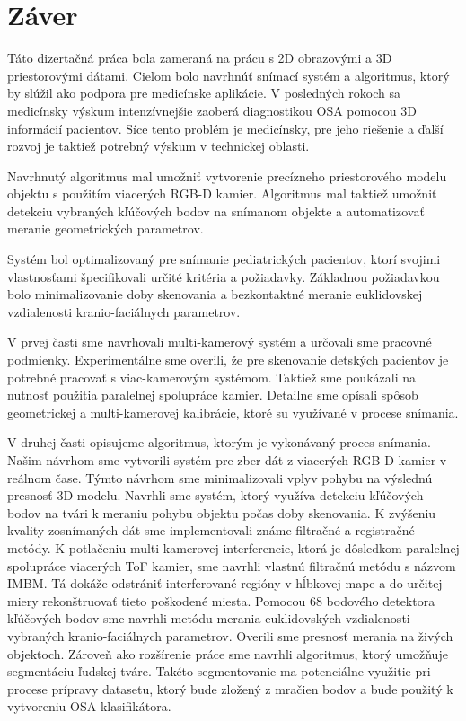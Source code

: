 \chapter{Záver}

\pagestyle{fancy}
\fancyhf{}
\fancyfoot[CE,CO]{\thepage}


Táto dizertačná práca bola zameraná na prácu s 2D obrazovými a 3D priestorovými dátami. Cieľom bolo navrhnúť snímací systém a algoritmus, ktorý by slúžil ako podpora pre medicínske aplikácie. V posledných rokoch sa medicínsky výskum intenzívnejšie zaoberá diagnostikou OSA pomocou 3D informácií pacientov. Síce tento problém je medicínsky, pre jeho riešenie a ďalší rozvoj je taktiež potrebný výskum v technickej oblasti. \newline

Navrhnutý algoritmus mal umožniť vytvorenie precízneho priestorového modelu objektu s použitím viacerých RGB-D kamier. Algoritmus mal taktiež umožniť detekciu vybraných kľúčových bodov na snímanom objekte a automatizovať meranie geometrických parametrov.  \newline

Systém bol optimalizovaný pre snímanie pediatrických pacientov, ktorí svojimi vlastnosťami špecifikovali určité kritéria a požiadavky. Základnou požiadavkou bolo minimalizovanie doby skenovania a bezkontaktné meranie euklidovskej vzdialenosti kranio-faciálnych parametrov.  \newline

V prvej časti sme navrhovali multi-kamerový systém a určovali sme pracovné podmienky. Experimentálne sme overili, že pre skenovanie detských pacientov je potrebné pracovať s viac-kamerovým systémom. Taktiež sme poukázali na nutnosť použitia paralelnej spolupráce kamier. Detailne sme opísali spôsob geometrickej a multi-kamerovej kalibrácie, ktoré su využívané v procese snímania.  \newpage

V druhej časti opisujeme algoritmus, ktorým je vykonávaný proces snímania. Našim návrhom sme vytvorili systém pre zber dát z viacerých RGB-D kamier v reálnom čase. Týmto návrhom sme minimalizovali vplyv pohybu na výslednú presnosť 3D modelu. Navrhli sme systém, ktorý využíva detekciu kľúčových bodov na tvári k meraniu pohybu objektu počas doby skenovania. K zvýšeniu kvality zosnímaných dát sme implementovali známe filtračné a registračné metódy. K potlačeniu multi-kamerovej interferencie, ktorá je dôsledkom paralelnej spolupráce viacerých ToF kamier, sme navrhli vlastnú filtračnú metódu s názvom IMBM. Tá dokáže odstrániť interferované regióny v hĺbkovej mape a do určitej miery rekonštruovať tieto poškodené miesta. Pomocou 68 bodového detektora kľúčových bodov sme navrhli metódu merania euklidovských vzdialenosti vybraných kranio-faciálnych parametrov. Overili sme presnosť merania na živých objektoch. Zároveň ako rozšírenie práce sme navrhli algoritmus, ktorý umožňuje segmentáciu ľudskej tváre. Takéto segmentovanie ma potenciálne využitie pri procese prípravy datasetu, ktorý bude zložený z mračien bodov a bude použitý k vytvoreniu OSA klasifikátora. \newline 

